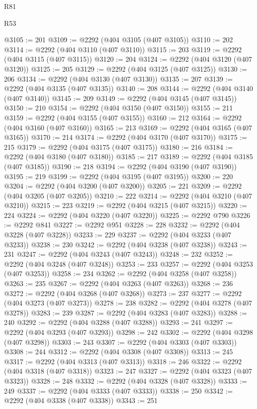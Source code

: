 \begin{lexlean}{R81}
\begin{lexlean}{R53}
\begin{coremodule}
{{{{{{{{{{{{{{{{{{{{{{{{{{{{{{{{{{{{{{{{{{{{{{{{{{{{{{{{{{{{{{{{{{{{{{{{{{{{{{{{{{{{{{{{{{{{{{{{{{{{{{{{{{{{{{{{@3105 := 201
@3109 := @2292 (@404 @3105 (@407 @3105))
@3110 := 202
@3114 := @2292 (@404 @3110 (@407 @3110))
@3115 := 203
@3119 := @2292 (@404 @3115 (@407 @3115))
@3120 := 204
@3124 := @2292 (@404 @3120 (@407 @3120))
@3125 := 205
@3129 := @2292 (@404 @3125 (@407 @3125))
@3130 := 206
@3134 := @2292 (@404 @3130 (@407 @3130))
@3135 := 207
@3139 := @2292 (@404 @3135 (@407 @3135))
@3140 := 208
@3144 := @2292 (@404 @3140 (@407 @3140))
@3145 := 209
@3149 := @2292 (@404 @3145 (@407 @3145))
@3150 := 210
@3154 := @2292 (@404 @3150 (@407 @3150))
@3155 := 211
@3159 := @2292 (@404 @3155 (@407 @3155))
@3160 := 212
@3164 := @2292 (@404 @3160 (@407 @3160))
@3165 := 213
@3169 := @2292 (@404 @3165 (@407 @3165))
@3170 := 214
@3174 := @2292 (@404 @3170 (@407 @3170))
@3175 := 215
@3179 := @2292 (@404 @3175 (@407 @3175))
@3180 := 216
@3184 := @2292 (@404 @3180 (@407 @3180))
@3185 := 217
@3189 := @2292 (@404 @3185 (@407 @3185))
@3190 := 218
@3194 := @2292 (@404 @3190 (@407 @3190))
@3195 := 219
@3199 := @2292 (@404 @3195 (@407 @3195))
@3200 := 220
@3204 := @2292 (@404 @3200 (@407 @3200))
@3205 := 221
@3209 := @2292 (@404 @3205 (@407 @3205))
@3210 := 222
@3214 := @2292 (@404 @3210 (@407 @3210))
@3215 := 223
@3219 := @2292 (@404 @3215 (@407 @3215))
@3220 := 224
@3224 := @2292 (@404 @3220 (@407 @3220))
@3225 := @2292 @790
@3226 := @2292 @841
@3227 := @2292 @951
@3228 := 228
@3232 := @2292 (@404 @3228 (@407 @3228))
@3233 := 229
@3237 := @2292 (@404 @3233 (@407 @3233))
@3238 := 230
@3242 := @2292 (@404 @3238 (@407 @3238))
@3243 := 231
@3247 := @2292 (@404 @3243 (@407 @3243))
@3248 := 232
@3252 := @2292 (@404 @3248 (@407 @3248))
@3253 := 233
@3257 := @2292 (@404 @3253 (@407 @3253))
@3258 := 234
@3262 := @2292 (@404 @3258 (@407 @3258))
@3263 := 235
@3267 := @2292 (@404 @3263 (@407 @3263))
@3268 := 236
@3272 := @2292 (@404 @3268 (@407 @3268))
@3273 := 237
@3277 := @2292 (@404 @3273 (@407 @3273))
@3278 := 238
@3282 := @2292 (@404 @3278 (@407 @3278))
@3283 := 239
@3287 := @2292 (@404 @3283 (@407 @3283))
@3288 := 240
@3292 := @2292 (@404 @3288 (@407 @3288))
@3293 := 241
@3297 := @2292 (@404 @3293 (@407 @3293))
@3298 := 242
@3302 := @2292 (@404 @3298 (@407 @3298))
@3303 := 243
@3307 := @2292 (@404 @3303 (@407 @3303))
@3308 := 244
@3312 := @2292 (@404 @3308 (@407 @3308))
@3313 := 245
@3317 := @2292 (@404 @3313 (@407 @3313))
@3318 := 246
@3322 := @2292 (@404 @3318 (@407 @3318))
@3323 := 247
@3327 := @2292 (@404 @3323 (@407 @3323))
@3328 := 248
@3332 := @2292 (@404 @3328 (@407 @3328))
@3333 := 249
@3337 := @2292 (@404 @3333 (@407 @3333))
@3338 := 250
@3342 := @2292 (@404 @3338 (@407 @3338))
@3343 := 251
}}}}}}}}}}}}}}}}}}}}}}}}}}}}}}}}}}}}}}}}}}}}}}}}}}}}}}}}}}}}}}}}}}}}}}}}}}}}}}}}}}}}}}}}}}}}}}}}}}}}}}}}}}}}}}}}
\end{coremodule}
\end{lexlean}
\end{lexlean}
